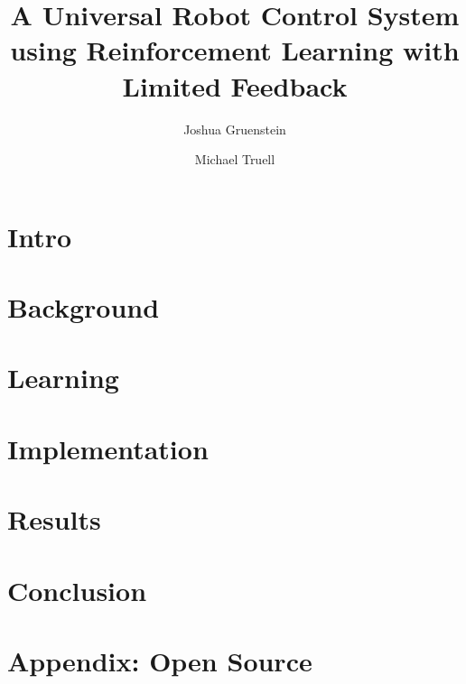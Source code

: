 \documentclass[letterpaper,11pt]{article}
\title{A Universal Robot Control System using Reinforcement Learning with Limited Feedback}
\author{Joshua Gruenstein \and Michael Truell}
\begin{document}
\maketitle



\pagebreak

\section{Intro}



\section{Background}



\section{Learning}



\section{Implementation}



\section{Results}



\section{Conclusion}



\nocite{*}

\pagebreak



\pagebreak

\section{Appendix: Open Source}


\end{document}
